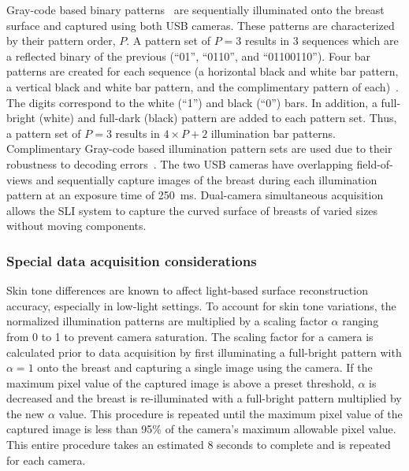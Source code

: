 Gray-code based binary patterns~\cite{Inokuchi1984} are sequentially illuminated onto the breast surface and captured using both USB cameras. These patterns are characterized by their pattern order, $P$. A pattern set of $P=3$ results in 3 sequences which are a reflected binary of the previous (``01'', ``0110'', and ``01100110''). Four bar patterns are created for each sequence (a horizontal black and white bar pattern, a vertical black and white bar pattern, and the complimentary pattern of each)~\cite{Sels2019}. The digits correspond to the white (``1'') and black (``0'') bars. In addition, a full-bright (white) and full-dark (black) pattern are added to each pattern set. Thus, a pattern set of $P=3$ results in $4\times P+2$ illumination bar patterns. Complimentary Gray-code based illumination pattern sets are used due to their robustness to decoding errors~\cite{Moreno2012}. The two USB cameras have overlapping field-of-views and sequentially capture images of the breast during each illumination pattern at an exposure time of 250~ms. Dual-camera simultaneous acquisition allows the SLI system to capture the curved surface of breasts of varied sizes without moving components. 

\subsubsection{Special data acquisition considerations}\label{sec:special}
Skin tone differences are known to affect light-based surface reconstruction accuracy, especially in low-light settings. To account for skin tone variations, the normalized illumination patterns are multiplied by a scaling factor $\alpha$ ranging from 0 to 1 to prevent camera saturation. The scaling factor for a camera is calculated prior to data acquisition by first illuminating a full-bright pattern with $\alpha=1$ onto the breast and capturing a single image using the camera. If the maximum pixel value of the captured image is above a preset threshold, $\alpha$ is decreased and the breast is re-illuminated with a full-bright pattern multiplied by the new $\alpha$ value. This procedure is repeated until the maximum pixel value of the captured image is less than 95\% of the camera's maximum allowable pixel value. This entire procedure takes an estimated 8 seconds to complete and is repeated for each camera.

